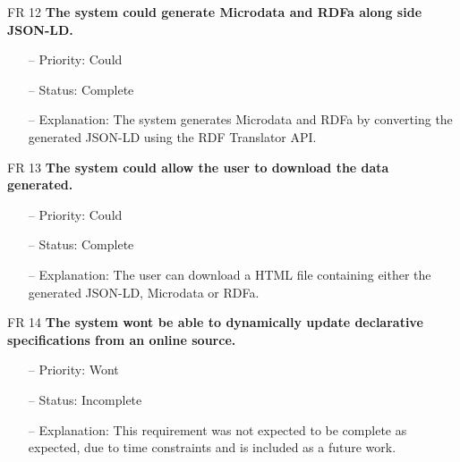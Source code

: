 \noindent
FR 12 \textbf{The system could generate Microdata and RDFa along side JSON-LD.}
\begin{itemize}
\item[--] Priority: Could
\item[--] Status: Complete
\item[--] Explanation: The system generates Microdata and RDFa by converting the generated JSON-LD using the RDF Translator API.
\end{itemize}
\noindent
FR 13 \textbf{The system could allow the user to download the data generated.}
\begin{itemize}
\item[--] Priority: Could
\item[--] Status: Complete
\item[--] Explanation: The user can download a HTML file containing either the generated JSON-LD, Microdata or RDFa.
\end{itemize}
FR 14 \textbf{The system wont be able to dynamically update declarative specifications from an online source.}
\begin{itemize}
\item[--] Priority: Wont
\item[--] Status: Incomplete
\item[--] Explanation: This requirement was not expected to be complete as expected, due to time constraints and is included as a future work.
\end{itemize}

